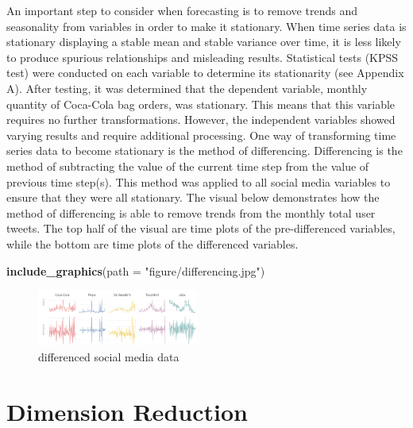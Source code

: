 \documentclass[12pt,oneside]{chicagocapstone}
\newenvironment{Shaded}{\begin{snugshade}}{\end{snugshade}}
\newcommand{\DataTypeTok}[1]{\textcolor[rgb]{0.13,0.29,0.53}{#1}}
\newcommand{\KeywordTok}[1]{\textcolor[rgb]{0.13,0.29,0.53}{\textbf{#1}}}
\newcommand{\NormalTok}[1]{#1}
\newcommand{\StringTok}[1]{\textcolor[rgb]{0.31,0.60,0.02}{#1}}
\begin{document}
An important step to consider when forecasting is to remove trends and seasonality from variables in order to make it stationary. When time series data is stationary displaying a stable mean and stable variance over time, it is less likely to produce spurious relationships and misleading results. Statistical tests (KPSS test) were conducted on each variable to determine its stationarity (see Appendix A). After testing, it was determined that the dependent variable, monthly quantity of Coca-Cola bag orders, was stationary. This means that this variable requires no further transformations. However, the independent variables showed varying results and require additional processing. One way of transforming time series data to become stationary is the method of differencing. Differencing is the method of subtracting the value of the current time step from the value of previous time step(s). This method was applied to all social media variables to ensure that they were all stationary. The visual below demonstrates how the method of differencing is able to remove trends from the monthly total user tweets. The top half of the visual are time plots of the pre-differenced variables, while the bottom are time plots of the differenced variables.
\begin{Shaded}
\begin{Highlighting}[]
\KeywordTok{include_graphics}\NormalTok{(}\DataTypeTok{path =} \StringTok{"figure/differencing.jpg"}\NormalTok{)}
\end{Highlighting}
\end{Shaded}
\begin{figure}

{\centering \includegraphics[width=200px]{figure/differencing} 

}

\caption{differenced social media data}\label{fig:differencing}
\end{figure}
\hypertarget{dimension-reduction}{%
\section*{Dimension Reduction}\label{dimension-reduction}}
\end{document}
